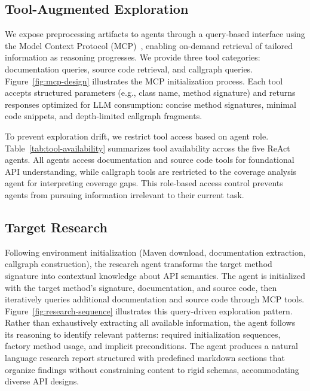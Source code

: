 \subsection{Tool-Augmented Exploration}%
\label{subsec:tool-augmented-exploration}

%
We expose preprocessing artifacts to agents through a query-based interface using the Model Context Protocol (MCP)~\cite{mcp2024}, enabling on-demand retrieval of tailored information as reasoning progresses.
%
We provide three tool categories: documentation queries, source code retrieval, and callgraph queries. Figure~\ref{fig:mcp-design} illustrates the MCP initialization process. Each tool accepts structured parameters (e.g., class name, method signature) and returns responses optimized for LLM consumption: concise method signatures, minimal code snippets, and depth-limited callgraph fragments.

To prevent exploration drift, we restrict tool access based on agent role. Table~\ref{tab:tool-availability} summarizes tool availability across the five ReAct agents. All agents access documentation and source code tools for foundational API understanding, while callgraph tools are restricted to the coverage analysis agent for interpreting coverage gaps. This role-based access control prevents agents from pursuing information irrelevant to their current task.

% 
%
\subsection{Target Research}%
\label{subsec:target-research}

Following environment initialization (Maven download, documentation extraction, callgraph construction), the research agent transforms the target method signature into contextual knowledge about API semantics. The agent is initialized with the target method's signature, documentation, and source code, then iteratively queries additional documentation and source code through MCP tools. Figure~\ref{fig:research-sequence} illustrates this query-driven exploration pattern. Rather than exhaustively extracting all available information, the agent follows its reasoning to identify relevant patterns: required initialization sequences, factory method usage, and implicit preconditions. The agent produces a natural language research report structured with predefined markdown sections that organize findings without constraining content to rigid schemas, accommodating diverse API designs.

